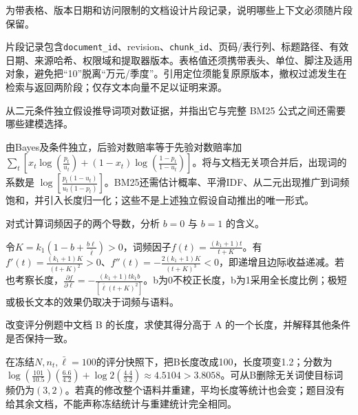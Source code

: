 
\begin{exercises}
\begin{exercise} 为带表格、版本日期和访问限制的文档设计片段记录，说明哪些上下文必须随片段保留。

\begin{solution}
片段记录包含\texttt{document\_id}、revision、\texttt{chunk\_id}、页码/表行列、标题路径、有效日期、来源哈希、权限域和提取器版本。表格值还须携带表头、单位、脚注及适用对象，避免把“10”脱离“万元/季度”。引用定位须能复原原版本，撤权过滤发生在检索与返回两阶段；仅存文本向量不足以证明来源。
\end{solution}
\end{exercise}

\begin{exercise} 从二元条件独立假设推导词项对数证据，并指出它与完整 BM25 公式之间还需要哪些建模选择。

\begin{solution}
由Bayes及条件独立，后验对数赔率等于先验对数赔率加 $\sum_t[x_t\log(\frac{p_t}{u_t})+(1-x_t)\log(\frac{1-p_t}{1-u_t})]$。将与文档无关项合并后，出现词的系数是 $\log[\frac{p_t(1-u_t)}{u_t(1-p_t)}]$。BM25还需估计概率、平滑IDF、从二元出现推广到词频饱和，并引入长度归一化；这些不是上述独立假设自动推出的唯一形式。
\end{solution}
\end{exercise}

\begin{exercise} 对式计算词频因子的两个导数，分析 $b=0$ 与 $b=1$ 的含义。

\begin{solution}
令$K=k_1(1-b+\frac{b\ell}{\bar\ell})>0$，词频因子$f(t)=\frac{(k_1+1)t}{t+K}$。有 $f'(t)=\frac{(k_1+1)K}{(t+K)^2}>0$、$f''(t)=-\frac{2(k_1+1)K}{(t+K)^3}<0$，即递增且边际收益递减。若也考察长度，$\frac{\partial f}{\partial\ell}=-\frac{(k_1+1)t k_1b}{[\bar\ell(t+K)^2]}$。b为0不校正长度，b为1采用全长度比例；极短或极长文本的效果仍取决于词频与语料。
\end{solution}
\end{exercise}

\begin{exercise} 改变评分例题中文档 B 的长度，求使其得分高于 A 的一个长度，并解释其他条件是否保持一致。

\begin{solution}
在冻结$N,n_t,\bar\ell=100$的评分快照下，把B长度改成100，长度项变1.2；分数为 $\log(\frac{101}{10.5})(\frac{6.6}{4.2})+\log2(\frac{4.4}{3.2})\approx4.5104>3.8058$。可从B删除无关词使目标词频仍为$(3,2)$。若真的修改整个语料并重建，平均长度等统计也会变；题目没有给其余文档，不能声称冻结统计与重建统计完全相同。
\end{solution}
\end{exercise}


\end{exercises}
